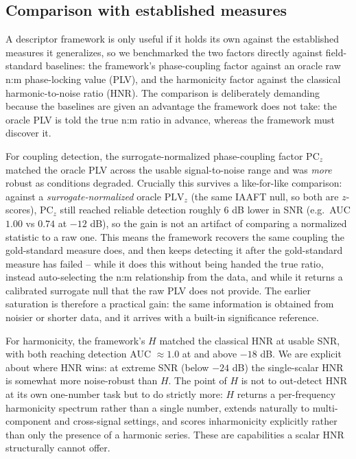 \documentclass[11pt]{article}
\begin{document}
\subsection{Comparison with established measures}
A descriptor framework is only useful if it holds its own against the established measures it generalizes, so we benchmarked the two factors directly against field-standard baselines: the framework's phase-coupling factor against an oracle raw n:m phase-locking value (PLV), and the harmonicity factor against the classical harmonic-to-noise ratio (HNR). The comparison is deliberately demanding because the baselines are given an advantage the framework does not take: the oracle PLV is told the true n:m ratio in advance, whereas the framework must discover it.

For coupling detection, the surrogate-normalized phase-coupling factor $\mathrm{PC}_z$ matched the oracle PLV across the usable signal-to-noise range and was \emph{more} robust as conditions degraded. Crucially this survives a like-for-like comparison: against a \emph{surrogate-normalized} oracle $\mathrm{PLV}_z$ (the same IAAFT null, so both are $z$-scores), $\mathrm{PC}_z$ still reached reliable detection roughly $6$ dB lower in SNR (e.g.\ AUC $1.00$ vs $0.74$ at $-12$ dB), so the gain is not an artifact of comparing a normalized statistic to a raw one. This means the framework recovers the same coupling the gold-standard measure does, and then keeps detecting it after the gold-standard measure has failed -- while it does this without being handed the true ratio, instead auto-selecting the n:m relationship from the data, and while it returns a calibrated surrogate null that the raw PLV does not provide. The earlier saturation is therefore a practical gain: the same information is obtained from noisier or shorter data, and it arrives with a built-in significance reference.

For harmonicity, the framework's $H$ matched the classical HNR at usable SNR, with both reaching detection AUC $\approx 1.0$ at and above $-18$ dB. We are explicit about where HNR wins: at extreme SNR (below $-24$ dB) the single-scalar HNR is somewhat more noise-robust than $H$. The point of $H$ is not to out-detect HNR at its own one-number task but to do strictly more: $H$ returns a per-frequency harmonicity spectrum rather than a single number, extends naturally to multi-component and cross-signal settings, and scores inharmonicity explicitly rather than only the presence of a harmonic series. These are capabilities a scalar HNR structurally cannot offer.
\end{document}
